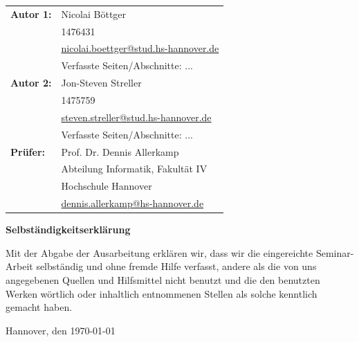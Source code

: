 \documentclass[12pt,DIV=14, version=first, BCOR=10mm,a4paper,twoside,parskip=half-,headsepline,headinclude]{scrartcl}
\begin{document}
  \newpage \thispagestyle{empty}
 \begin{tabular}{ll}
{\bfseries\sffamily Autor 1:} &  Nicolai Böttger \\ 
            & 1476431 \\
            & \href{mailto:nicolai.boettger@stud.hs-hannover.de}{nicolai.boettger@stud.hs-hannover.de} \\
            & Verfasste Seiten/Abschnitte: ...
            \\[5ex]
{\bfseries\sffamily Autor 2:} & Jon-Steven Streller \\ 
            & 1475759 \\
            & \href{mailto:steven.streller@stud.hs-hannover.de}{steven.streller@stud.hs-hannover.de} \\
           & Verfasste Seiten/Abschnitte: ... \\[5ex]
 {\bfseries\sffamily Prüfer:} &Prof. Dr. Dennis Allerkamp \\
          & Abteilung Informatik, Fakultät IV \\
         & Hochschule Hannover \\
        & \href{mailto:dennis.allerkamp@hs-hannover.de}{dennis.allerkamp@hs-hannover.de}
\end{tabular}

\vfill

\begin{center} \sffamily\bfseries Selbständigkeitserklärung \end{center}

Mit der Abgabe der Ausarbeitung erklären wir, dass wir die eingereichte Seminar-Arbeit
selbständig und ohne fremde Hilfe verfasst, andere als die von uns angegebenen Quellen
und Hilfsmittel nicht benutzt und die den benutzten Werken wörtlich oder
inhaltlich entnommenen Stellen als solche kenntlich gemacht haben. 
\vspace*{7ex}

Hannover, den \today \hfill 

\pagebreak

  \tableofcontents  %

\pagebreak

%


\end{document}
